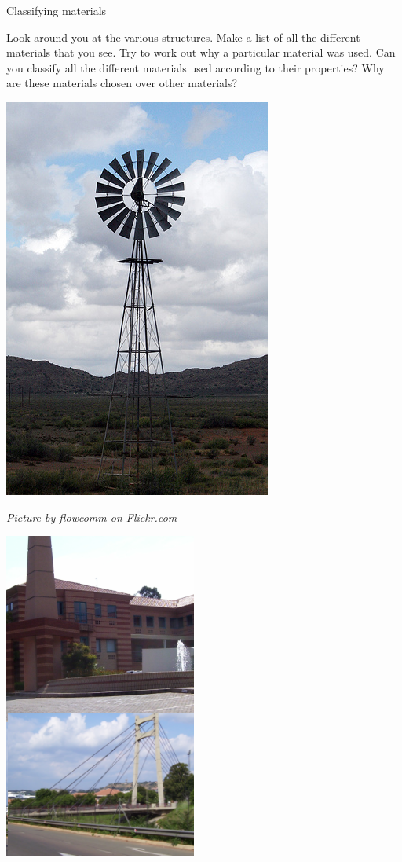 \begin{activity}{Classifying materials} {
\begin{minipage}{.4\textwidth}
Look around you at the various structures. Make a list of all the different materials that you see. Try to work out why a particular material was used. Can you classify all the different materials used according to their properties? Why are these materials chosen over other materials?
\end{minipage}
\begin{minipage}{.3\textwidth}
\begin{center}
 \includegraphics[height=.7\textwidth]{photos/windmillby-flowcomm-flickr.jpg}\par
\textit{Picture by flowcomm on Flickr.com}
\end{center}
\end{minipage}
\begin{minipage}{.3\textwidth}
\begin{center}
 \includegraphics[height=.7\textwidth]{photos/materials.png}\par
\end{center}
\end{minipage}
}
\end{activity}


